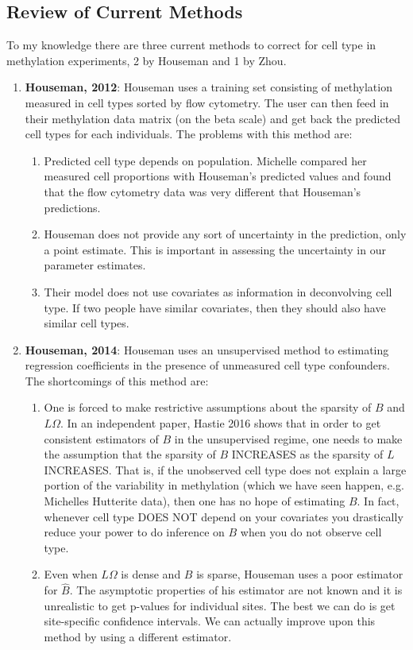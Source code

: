 \documentclass{article}
\begin{document}
\subsection{Review of Current Methods}
To my knowledge there are three current methods to correct for cell type in methylation experiments, 2 by Houseman and 1 by Zhou.
	\begin{enumerate}
	\item \textbf{Houseman, 2012}: Houseman uses a training set consisting of methylation measured in cell types sorted by flow cytometry. The user can then feed in their methylation data matrix (on the beta scale) and get back the predicted cell types for each individuals. The problems with this method are:
		\begin{enumerate}
		\item Predicted cell type depends on population. Michelle compared her measured cell proportions with Houseman's predicted values and found that the flow cytometry data was very different that Houseman's predictions.
		\item Houseman does not provide any sort of uncertainty in the prediction, only a point estimate. This is important in assessing the uncertainty in our parameter estimates.
		\item Their model does not use covariates as information in deconvolving cell type. If two people have similar covariates, then they should also have similar cell types.
		\end{enumerate}
		
		\item \textbf{Houseman, 2014}: Houseman uses an unsupervised method to estimating regression coefficients in the presence of unmeasured cell type confounders. The shortcomings of this method are:
			\begin{enumerate}
			\item One is forced to make restrictive assumptions about the sparsity of $B$ and $L \Omega$. In an independent paper, Hastie 2016 shows that in order to get consistent estimators of $B$ in the unsupervised regime, one needs to make the assumption that the sparsity of $B$ INCREASES as the sparsity of $L$ INCREASES. That is, if the unobserved cell type does not explain a large portion of the variability in methylation (which we have seen happen, e.g. Michelles Hutterite data), then one has no hope of estimating $B$. In fact, whenever cell type DOES NOT depend on your covariates you drastically reduce your power to do inference on $B$ when you do not observe cell type.
			\item Even when $L \Omega$ is dense and $B$ is sparse, Houseman uses a poor estimator for $\hat{B}$. The asymptotic properties of his estimator are not known and it is unrealistic to get p-values for individual sites. The best we can do is get site-specific confidence intervals. We can actually improve upon this method by using a different estimator.
			\end{enumerate}
			

\end{enumerate}
\end{document}
